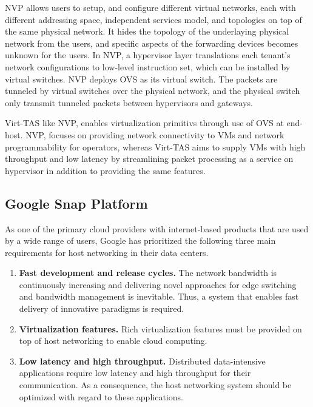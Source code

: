 NVP allows users to setup, and configure different virtual networks, each with
different addressing space, independent services model, and topologies
on top of the same physical network. It hides the topology of  the underlaying physical network
from the users, and specific aspects of the forwarding devices becomes unknown for the users. 
In NVP, a hypervisor layer translations each tenant's network configurations to 
low-level instruction set, which can be installed by virtual switches. NVP deploys OVS
as its virtual switch. The packets are tunneled by virtual switches over the physical network, and 
the physical switch only transmit tunneled packets between hypervisors and gateways.

Virt-TAS like NVP, enables virtualization primitivs through use of OVS at end-host. 
NVP, focuses on providing network connectivity to VMs and network programmability 
for operators, whereas Virt-TAS aims to supply VMs with high throughput and low latency 
by streamlining packet processing as a service on hypervisor in addition to providing 
the same features.


\subsection{Google Snap Platform}
\label{snap}

As one of the primary cloud providers with internet-based products that are used by a wide 
range of users, Google has prioritized the following three main requirements for host 
networking in their data centers. 

\begin{enumerate}
    \item \textbf{Fast development and release cycles.} The network bandwidth is continuously 
    increasing and delivering novel approaches for edge switching and bandwidth management is 
    inevitable. Thus, a system that enables fast delivery of innovative paradigms is required.

    \item \textbf{Virtualization features.} Rich virtualization features must be provided on 
    top of host networking to enable cloud computing.

    \item \textbf{Low latency and high throughput.} Distributed data-intensive applications 
    require low latency and high throughput for their communication. As a consequence, the 
    host networking system should be optimized with regard to these applications.

\end{enumerate}

